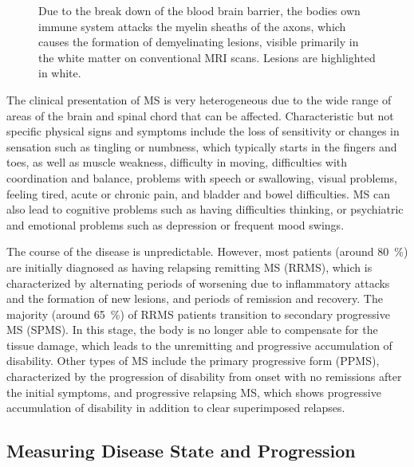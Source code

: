 \begin{figure}[tb]

\caption[Demyelination in MS]{Due to the break down of the blood brain barrier,
the bodies own immune system attacks the myelin sheaths of the axons, which
causes the formation of demyelinating lesions, visible primarily in the white
matter on conventional MRI scans. Lesions are highlighted in white.}
\end{figure}
 
The clinical presentation of MS is very heterogeneous due to the wide range of
areas of the brain and spinal chord that can be affected. Characteristic but not
specific physical signs and symptoms include the loss of sensitivity or changes
in sensation such as tingling or numbness, which typically starts in the fingers
and toes, as well as muscle weakness, difficulty in moving, difficulties with
coordination and balance, problems with speech or swallowing, visual problems,
feeling tired, acute or chronic pain, and bladder and bowel difficulties. MS can
also lead to cognitive problems such as having difficulties thinking, or
psychiatric and emotional problems such as depression or frequent mood swings.

The course of the disease is unpredictable. However, most patients (around
\SI{80}{\percent}) are initially diagnosed as having relapsing remitting MS
(RRMS), which is characterized by alternating periods of worsening due to
inflammatory attacks and the formation of new lesions, and periods of remission
and recovery. The majority (around \SI{65}{\percent}) of RRMS patients
transition to secondary progressive MS (SPMS). In this stage, the body is no
longer able to compensate for the tissue damage, which leads to the unremitting
and progressive accumulation of disability. Other types of MS include the
primary progressive form (PPMS), characterized by the progression of disability
from onset with no remissions after the initial symptoms, and progressive
relapsing MS, which shows progressive accumulation of disability in addition to
clear superimposed relapses.


\subsection[Measuring disease state and progression]{Measuring Disease State and
Progression}

